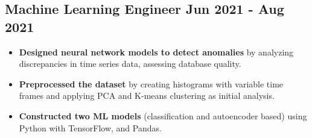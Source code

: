 \documentclass[]{article}
\begin{document}
\vspace{2ex}

\subsection{\large{Machine Learning Engineer} \hfill{\small{Jun 2021 - Aug 2021}}}
\vspace{1.5ex}

\begin{itemize}
    \item \textbf{Designed neural network models to detect anomalies} by analyzing discrepancies in time series data, assessing database quality.
    \item \textbf{Preprocessed the dataset} by creating histograms with variable time frames and applying PCA and K-means clustering as initial analysis.
    \item \textbf{Constructed two ML models} (classification and autoencoder based) using Python with TensorFlow, and Pandas.
\end{itemize}
\end{document}
